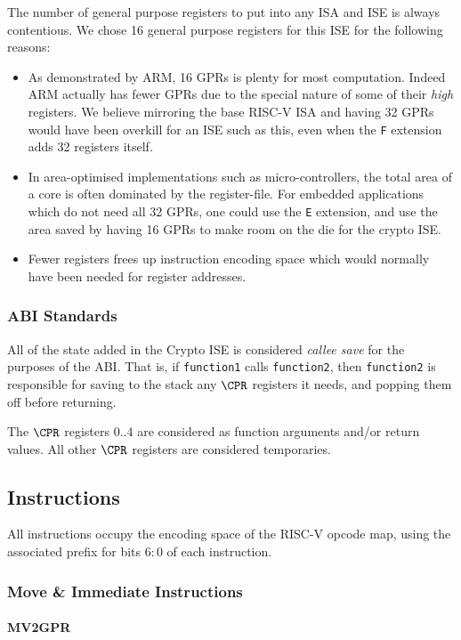 The number of general purpose registers to put into any ISA and ISE is
always contentious. We chose 16 general purpose registers for this ISE
for the following reasons:
\begin{itemize}
\item As demonstrated by ARM, 16 GPRs is plenty for most computation. Indeed
ARM actually has fewer GPRs due to the special nature of some of their
{\em high} registers. We believe mirroring the base RISC-V ISA and having
32 GPRs would have been overkill for an ISE such as this, even when the
{\tt F} extension adds 32 registers itself.
\item In area-optimised implementations such as micro-controllers, the
total area of a core is often dominated by the register-file. For embedded
applications which do not need all 32 GPRs, one could use the {\tt E}
extension, and use the area saved by having 16 GPRs to make room on the die
for the crypto ISE.
\item Fewer registers frees up instruction encoding space which would
normally have been needed for register addresses.
\end{itemize}

\subsubsection{ABI Standards}

All of the state added in the Crypto ISE is considered {\em callee save}
for the purposes of the ABI. That is, if {\tt function1} calls 
{\tt function2}, then {\tt function2} is responsible for saving to the
stack any $\CPR$ registers it needs, and popping them off before returning.

The $\CPR$ registers $0..4$ are considered as function arguments
and/or return values. 
All other $\CPR$ registers are considered temporaries.

\subsection{Instructions}

All instructions occupy the \encspace encoding space of the RISC-V opcode
map, using the associated \encopcode prefix for bits $6:0$ of each 
instruction.

\subsubsection{Move \& Immediate Instructions}
\paragraph{MV2GPR}

